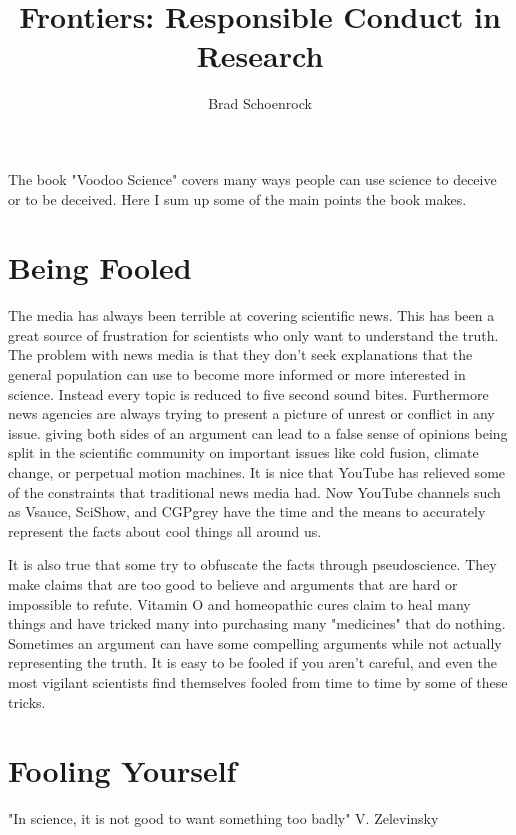 \documentclass{article}
\author{Brad Schoenrock}
\title{Frontiers: Responsible Conduct in Research}
\date{}
\begin{document}
\maketitle
\Large

The book "Voodoo Science" covers many ways people can use science to deceive or to be deceived. Here I sum up some of the main points the book makes. 

\section{Being Fooled}

The media has always been terrible at covering scientific news. This has been a great source of frustration for scientists who only want to understand the truth. The problem with news media is that they don't seek explanations that the general population can use to become more informed or more interested in science. Instead every topic is reduced to five second sound bites. Furthermore news agencies are always trying to present a picture of unrest or conflict in any issue. giving both sides of an argument can lead to a false sense of opinions being split in the scientific community on important issues like cold fusion, climate change, or perpetual motion machines. It is nice that YouTube has relieved some of the constraints that traditional news media had. Now YouTube channels such as Vsauce, SciShow, and CGPgrey have the time and the means to accurately represent the facts about cool things all around us. 

It is also true that some try to obfuscate the facts through pseudoscience. They make claims that are too good to believe and arguments that are hard or impossible to refute. Vitamin O and homeopathic cures claim to heal many things and have tricked many into purchasing many "medicines" that do nothing. Sometimes an argument can have some compelling arguments while not actually representing the truth. It is easy to be fooled if you aren't careful, and even the most vigilant scientists find themselves fooled from time to time by some of these tricks. 

\section{Fooling Yourself}

"In science, it is not good to want something too badly" V. Zelevinsky 
\end{document}
